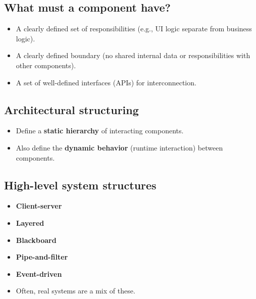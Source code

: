 \documentclass[11pt,a4paper]{article}
\begin{document}
\subsection*{What must a component have?}
\begin{itemize}
    \item A clearly defined set of responsibilities (e.g., UI logic separate from business logic).
    \item A clearly defined boundary (no shared internal data or responsibilities with other components).
    \item A set of well-defined interfaces (APIs) for interconnection.
\end{itemize}

\subsection*{Architectural structuring}
\begin{itemize}
    \item Define a \textbf{static hierarchy} of interacting components.
    \item Also define the \textbf{dynamic behavior} (runtime interaction) between components.
\end{itemize}

\subsection*{High-level system structures}
\begin{itemize}
    \item \textbf{Client-server}
    \item \textbf{Layered}
    \item \textbf{Blackboard}
    \item \textbf{Pipe-and-filter}
    \item \textbf{Event-driven}
    \item Often, real systems are a mix of these.
\end{itemize}
\end{document}

